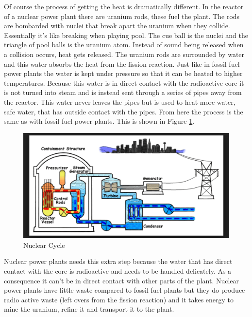 \documentclass[msc,oneside]{ubcthesis}%
\begin{document}
Of course the process of getting the heat is dramatically different. In the reactor of a nuclear power 
plant there are uranium rods, these fuel the plant. The rods are bombarded with nuclei that break apart the 
uranium when they collide. Essentially it's like breaking when playing pool. The cue ball is the nuclei and 
the triangle of pool balls is the uranium atom. Instead of sound being released when a collision occurs, 
heat gets released. The uranium rods are surrounded by water and this water absorbs the heat from the 
fission reaction. Just like in fossil fuel power plants the water is kept under pressure so that it can be 
heated to higher temperatures. Because this water is in direct contact with the radioactive core it is not 
turned into steam and is instead sent through a series of pipes away from the reactor. This water never 
leaves the pipes but is used to heat more water, safe water, that has outside contact with the pipes. From 
here the process is the same as with fossil fuel power plants. This is shown in Figure \ref{nuclearCycle}.

\begin{figure}[hbt]\label{nuclearCycle}
  \begin{center}
    \includegraphics[width=1\textwidth]{nuclear}
    \caption[Nuclear Cycle]{Nuclear Cycle }
  \end{center}
\end{figure}

Nuclear power plants needs this extra step because the water that has direct contact with the core is 
radioactive and needs to be handled delicately. As a consequence it can't be in direct contact with other 
parts of the plant. Nuclear power plants have little waste compared to fossil fuel plants but they do 
produce radio active waste (left overs from the fission reaction) and it takes energy to mine the uranium, 
refine it and transport it to the plant.
\end{document}
